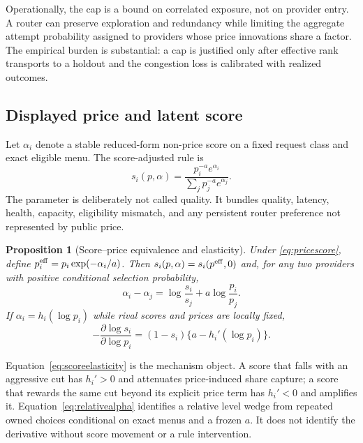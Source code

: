 \documentclass[sigconf,nonacm]{acmart}
\newtheorem{proposition}{Proposition}
\newcommand{\1}{\mathbf 1}
\begin{document}
Operationally, the cap is a bound on correlated exposure, not on provider
entry.  A router can preserve exploration and redundancy while limiting the
aggregate attempt probability assigned to providers whose price innovations
share a factor.  The empirical burden is substantial: a cap is justified only
after effective rank transports to a holdout and the congestion loss is
calibrated with realized outcomes.

\subsection{Displayed price and latent score}

Let $\alpha_i$ denote a stable reduced-form non-price score on a fixed request
class and exact eligible menu.  The score-adjusted rule is
\begin{equation}
s_i(p,\alpha)=
\frac{p_i^{-a}e^{\alpha_i}}{\sum_j p_j^{-a}e^{\alpha_j}}.
\label{eq:pricescore}
\end{equation}
The parameter is deliberately not called quality.  It bundles quality, latency,
health, capacity, eligibility mismatch, and any persistent router preference
not represented by public price.

\begin{proposition}[Score--price equivalence and elasticity]
\label{prop:scoreprice}
Under \eqref{eq:pricescore}, define
$p_i^{\rm eff}=p_i\exp(-\alpha_i/a)$.  Then
$s_i(p,\alpha)=s_i(p^{\rm eff},0)$ and, for any two providers with positive
conditional selection probability,
\begin{equation}
\alpha_i-\alpha_j
=\log\frac{s_i}{s_j}+a\log\frac{p_i}{p_j}.
\label{eq:relativealpha}
\end{equation}
If $\alpha_i=h_i(\log p_i)$ while rival scores and prices are locally fixed,
\begin{equation}
-\frac{\partial\log s_i}{\partial\log p_i}
=(1-s_i)\{a-h_i'(\log p_i)\}.
\label{eq:scoreelasticity}
\end{equation}
\end{proposition}

Equation~\eqref{eq:scoreelasticity} is the mechanism object.  A score that
falls with an aggressive cut has $h_i'>0$ and attenuates price-induced share
capture; a score that rewards the same cut beyond its explicit price term has
$h_i'<0$ and amplifies it.  Equation~\eqref{eq:relativealpha} identifies a
relative level wedge from repeated owned choices conditional on exact menus and
a frozen $a$.  It does not identify the derivative without score movement or a
rule intervention.
\end{document}
